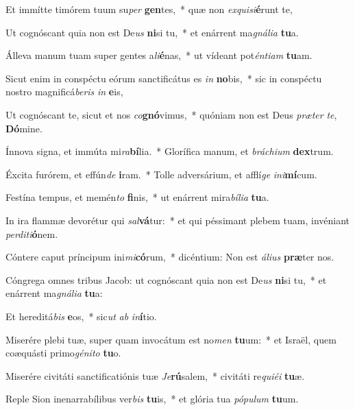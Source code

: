 \item Et immítte timórem tuum su\textit{per} \textbf{gen}tes,~* quæ non \textit{ex}\textit{qui}\textit{si}\textbf{é}runt te,
\item Ut cognóscant quia non est De\textit{us} \textbf{ni}si tu,~* et enárrent ma\textit{gná}\textit{li}\textit{a} \textbf{tu}a.
\item Álleva manum tuam super gentes a\textit{li}\textbf{é}nas,~* ut vídeant pot\textit{én}\textit{ti}\textit{am} \textbf{tu}am.
\item Sicut enim in conspéctu eórum sanctificátus es \textit{in} \textbf{no}bis,~* sic in conspéctu nostro magnificá\textit{be}\textit{ris} \textit{in} \textbf{e}is,
\item Ut cognóscant te, sicut et nos \textit{co}\textbf{gnó}vimus,~* quóniam non est Deus \textit{præ}\textit{ter} \textit{te}, \textbf{Dó}mine.
\item Ínnova signa, et immúta mi\textit{ra}\textbf{bí}lia.~* Glorífica manum, et \textit{brá}\textit{chi}\textit{um} \textbf{dex}trum.
\item Éxcita furórem, et effún\textit{de} \textbf{i}ram.~* Tolle adversárium, et afflí\textit{ge} \textit{in}\textit{i}\textbf{mí}cum.
\item Festína tempus, et memén\textit{to} \textbf{fi}nis,~* ut enárrent mira\textit{bí}\textit{li}\textit{a} \textbf{tu}a.
\item In ira flammæ devorétur qui \textit{sal}\textbf{vá}tur:~* et qui péssimant plebem tuam, invéniant \textit{per}\textit{di}\textit{ti}\textbf{ó}nem.
\item Cóntere caput príncipum ini\textit{mi}\textbf{có}rum,~* dicéntium: Non est \textit{á}\textit{li}\textit{us} \textbf{præ}ter nos.
\item Cóngrega omnes tribus Jacob: ut cognóscant quia non est De\textit{us} \textbf{ni}si tu,~* et enárrent ma\textit{gná}\textit{li}\textit{a} \textbf{tu}a:
\item Et hereditá\textit{bis} \textbf{e}os,~* sic\textit{ut} \textit{ab} \textit{in}\textbf{í}tio.
\item Miserére plebi tuæ, super quam invocátum est no\textit{men} \textbf{tu}um:~* et Israël, quem coæquásti primo\textit{gé}\textit{ni}\textit{to} \textbf{tu}o.
\item Miserére civitáti sanctificatiónis tuæ \textit{Je}\textbf{rú}salem,~* civitáti re\textit{qui}\textit{é}\textit{i} \textbf{tu}æ.
\item Reple Sion inenarrabílibus ver\textit{bis} \textbf{tu}is,~* et glória tua \textit{pó}\textit{pu}\textit{lum} \textbf{tu}um.
